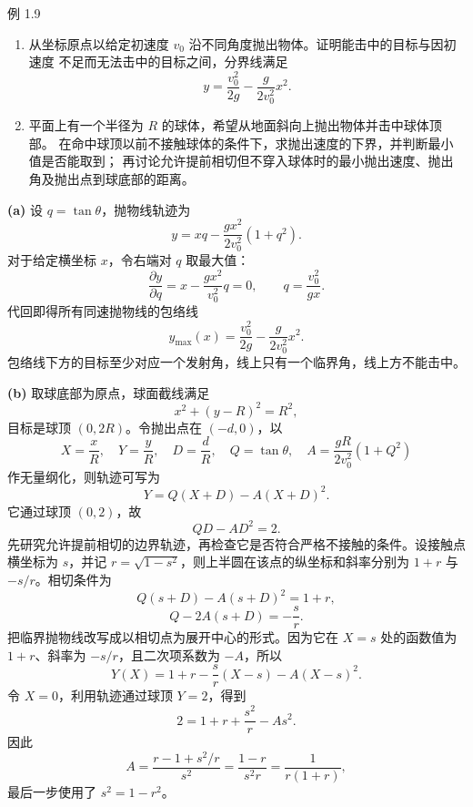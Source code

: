 \Needspace{0.43\textheight}
\begin{origexamplebox}{例 1.9}
\begin{enumerate}[label=(\alph*),leftmargin=2.2em]
 \item 从坐标原点以给定初速度 $v_0$ 沿不同角度抛出物体。证明能击中的目标与因初速度
 不足而无法击中的目标之间，分界线满足
 \[
  y=\frac{v_0^2}{2g}-\frac{g}{2v_0^2}x^2.
 \]
 \item 平面上有一个半径为 $R$ 的球体，希望从地面斜向上抛出物体并击中球体顶部。
 在命中球顶以前不接触球体的条件下，求抛出速度的下界，并判断最小值是否能取到；
 再讨论允许提前相切但不穿入球体时的最小抛出速度、抛出角及抛出点到球底部的距离。
\end{enumerate}
\end{origexamplebox}

\begin{xesolution}
\textbf{(a)} 设 $q=\tan\theta$，抛物线轨迹为
\[
 y=xq-\frac{gx^2}{2v_0^2}(1+q^2).
\]
对于给定横坐标 $x$，令右端对 $q$ 取最大值：
\[
 \frac{\partial y}{\partial q}=x-\frac{gx^2}{v_0^2}q=0,\qquad
 q=\frac{v_0^2}{gx}.
\]
代回即得所有同速抛物线的包络线
\[
 \boxed{y_{\max}(x)=\frac{v_0^2}{2g}-\frac{g}{2v_0^2}x^2}.
\]
包络线下方的目标至少对应一个发射角，线上只有一个临界角，线上方不能击中。

\textbf{(b)} 取球底部为原点，球面截线满足
\[
 x^2+(y-R)^2=R^2,
\]
目标是球顶 $(0,2R)$。令抛出点在 $(-d,0)$，以
\[
 X=\frac{x}{R},\quad Y=\frac{y}{R},\quad D=\frac dR,
 \quad Q=\tan\theta,
 \quad A=\frac{gR}{2v_0^2}(1+Q^2)
\]
作无量纲化，则轨迹可写为
\[
 Y=Q(X+D)-A(X+D)^2.
\]
它通过球顶 $(0,2)$，故
\begin{equation}\label{eq:sphere-top}
 QD-AD^2=2.
\end{equation}
先研究允许提前相切的边界轨迹，再检查它是否符合严格不接触的条件。设接触点
横坐标为 $s$，并记 $r=\sqrt{1-s^2}$，则上半圆在该点的纵坐标和斜率分别为
$1+r$ 与 $-s/r$。相切条件为
\begin{equation}\label{eq:sphere-tangent-point}
 Q(s+D)-A(s+D)^2=1+r,
\end{equation}
\begin{equation}\label{eq:sphere-tangent-slope}
 Q-2A(s+D)=-\frac{s}{r}.
\end{equation}
把临界抛物线改写成以相切点为展开中心的形式。因为它在
$X=s$ 处的函数值为 $1+r$、斜率为 $-s/r$，且二次项系数为 $-A$，所以
\[
 Y(X)=1+r-\frac{s}{r}(X-s)-A(X-s)^2.
\]
令 $X=0$，利用轨迹通过球顶 $Y=2$，得到
\[
 2=1+r+\frac{s^2}{r}-As^2.
\]
因此
\[
 A=\frac{r-1+s^2/r}{s^2}
 =\frac{1-r}{s^2r}
 =\frac{1}{r(1+r)},
\]
最后一步使用了 $s^2=1-r^2$。


\end{xesolution}
